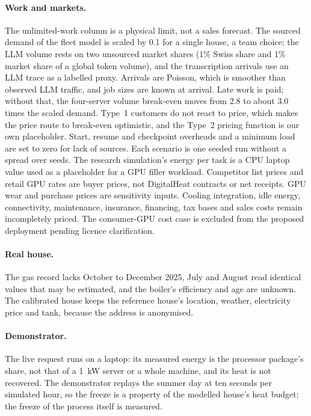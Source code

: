 \paragraph{Work and markets.} The unlimited-work column is a physical limit, not a sales
forecast. The sourced demand of the fleet model is scaled by 0.1 for a single house, a team choice;
the LLM volume rests on two unsourced market shares (1\% Swiss share and 1\% market share of a
global token volume), and the transcription arrivals use an LLM trace as a labelled proxy.
Arrivals are Poisson, which is smoother than observed LLM traffic, and job sizes are known at
arrival. Late work is paid; without that, the four-server volume break-even moves from 2.8 to
about 3.0 times the scaled demand. Type~1 customers do not react to price, which makes the price
route to break-even optimistic, and the Type~2 pricing function is our own placeholder. Start,
resume and checkpoint overheads and a minimum load are set to zero for lack of sources. Each
scenario is one seeded run without a spread over seeds. The research simulation's energy per task
is a CPU laptop value used as a placeholder for a GPU filler workload. Competitor list prices and
retail GPU rates are buyer prices, not DigitalHeat contracts or net receipts. GPU wear and purchase
prices are sensitivity inputs. Cooling integration, idle energy, connectivity, maintenance,
insurance, financing, tax bases and sales costs remain incompletely priced. The consumer-GPU cost
case is excluded from the proposed deployment pending licence clarification.

\paragraph{Real house.} The gas record lacks October to December 2025, July and August read
identical values that may be estimated, and the boiler's efficiency and age are unknown. The
calibrated house keeps the reference house's location, weather, electricity price and tank, because
the address is anonymised.

\paragraph{Demonstrator.} The live request runs on a laptop: its measured energy is the
processor package's share, not that of a \qty{1}{kW} server or a whole machine, and its heat is not
recovered. The demonstrator replays the summer day at ten seconds per simulated hour, so the
freeze is a property of the modelled house's heat budget; the freeze of the process itself is
measured.

